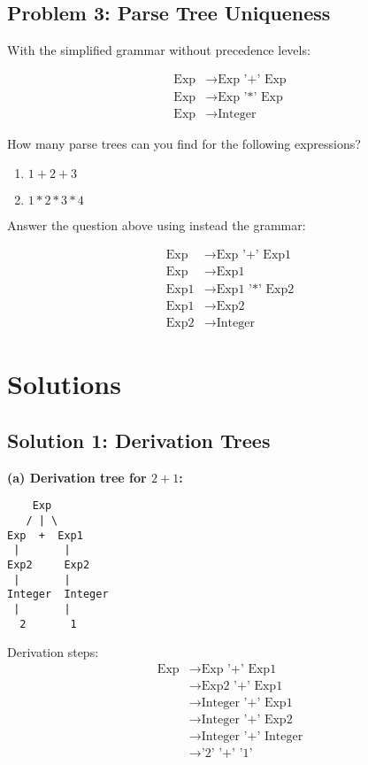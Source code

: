 \documentclass[12pt]{article}
\begin{document}
\subsection*{Problem 3: Parse Tree Uniqueness}

With the simplified grammar without precedence levels:

\begin{align}
\text{Exp} &\to \text{Exp '+' Exp} \\
\text{Exp} &\to \text{Exp '*' Exp} \\
\text{Exp} &\to \text{Integer}
\end{align}

How many parse trees can you find for the following expressions?

\begin{enumerate}[label=(\alph*)]
    \item $1+2+3$
    \item $1*2*3*4$
\end{enumerate}

Answer the question above using instead the grammar:

\begin{align}
\text{Exp} &\to \text{Exp '+' Exp1} \\
\text{Exp} &\to \text{Exp1} \\
\text{Exp1} &\to \text{Exp1 '*' Exp2} \\
\text{Exp1} &\to \text{Exp2} \\
\text{Exp2} &\to \text{Integer}
\end{align}

\newpage

\section*{Solutions}

\subsection*{Solution 1: Derivation Trees}

\textbf{(a) Derivation tree for $2+1$:}

\begin{verbatim}
    Exp
   / | \
Exp  +  Exp1
 |       |
Exp2     Exp2
 |       |
Integer  Integer
 |       |
  2       1
\end{verbatim}

Derivation steps:
\begin{align}
\text{Exp} &\to \text{Exp '+' Exp1} \\
&\to \text{Exp2 '+' Exp1} \\
&\to \text{Integer '+' Exp1} \\
&\to \text{Integer '+' Exp2} \\
&\to \text{Integer '+' Integer} \\
&\to \text{'2' '+' '1'}
\end{align}
\end{document}
